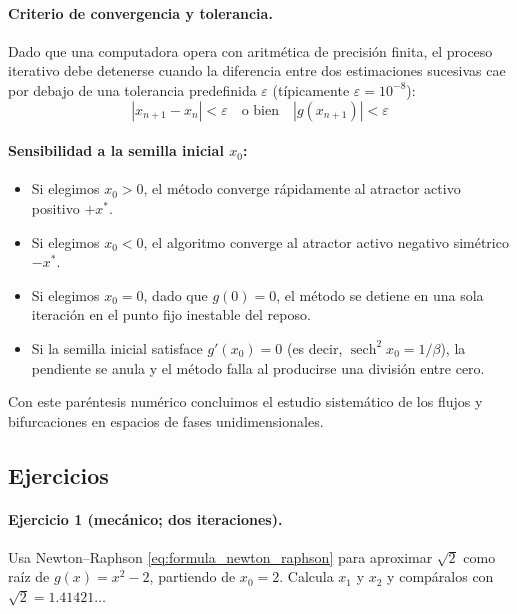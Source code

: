 \paragraph{Criterio de convergencia y tolerancia.}
Dado que una computadora opera con aritmética de precisión finita, el proceso iterativo debe detenerse cuando la diferencia entre dos estimaciones sucesivas cae por debajo de una tolerancia predefinida $\varepsilon$ (típicamente $\varepsilon = 10^{-8}$):
\begin{equation}
    |x_{n+1} - x_n| < \varepsilon \quad \text{o bien} \quad |g(x_{n+1})| < \varepsilon
\end{equation}

\paragraph{Sensibilidad a la semilla inicial $x_0$:}
\begin{itemize}
    \item Si elegimos $x_0 > 0$, el método converge rápidamente al atractor activo positivo $+x^*$.
    \item Si elegimos $x_0 < 0$, el algoritmo converge al atractor activo negativo simétrico $-x^*$.
    \item Si elegimos $x_0 = 0$, dado que $g(0) = 0$, el método se detiene en una sola iteración en el punto fijo inestable del reposo.
    \item Si la semilla inicial satisface $g'(x_0) = 0$ (es decir, $\operatorname{sech}^2 x_0 = 1/\beta$), la pendiente se anula y el método falla al producirse una división entre cero.
\end{itemize}

Con este paréntesis numérico concluimos el estudio sistemático de los flujos y bifurcaciones en espacios de fases unidimensionales.

\subsection{Ejercicios}

\paragraph{Ejercicio 1 (mecánico; dos iteraciones).} Usa Newton--Raphson \eqref{eq:formula_newton_raphson} para aproximar $\sqrt{2}$ como raíz de $g(x)=x^2-2$, partiendo de $x_0=2$. Calcula $x_1$ y $x_2$ y compáralos con $\sqrt2=1.41421\dots$

